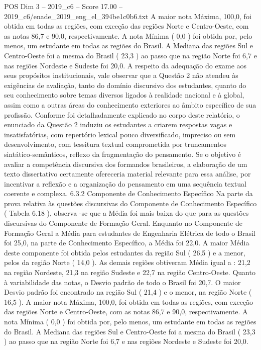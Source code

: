 \begin{textsample}{POS Dim 3 – 2019\_c6 – Score 17.00 – 2019\_c6/enade\_2019\_eng\_el\_394be1c0b6.txt}
A maior nota Máxima, 100,0, foi obtida em todas as regiões, com exceção das regiões Norte e Centro-Oeste, com as notas 86,7 e 90,0, respectivamente.
A nota Mínima ( 0,0 ) foi obtida por, pelo menos, um estudante em todas as regiões do Brasil.
A Mediana das regiões Sul e Centro-Oeste foi a mesma do Brasil ( 23,3 ) ao passo que na região Norte foi 6,7 e nas regiões Nordeste e Sudeste foi 20,0.
A respeito da adequação do exame aos seus propósitos institucionais, vale observar que a Questão 2 não atendeu às exigências de avaliação, tanto do domínio discursivo dos estudantes, quanto do seu conhecimento sobre temas diversos ligados à realidade nacional e à global, assim como a outras áreas do conhecimento exteriores ao âmbito específico de sua profissão.
Conforme foi detalhadamente explicado no corpo deste relatório, o enunciado da Questão 2 induziu os estudantes a criarem respostas vagas e insatisfatórias, com repertório lexical pouco diversificado, impreciso ou sem desenvolvimento, com tessitura textual comprometida por truncamentos sintático-semânticos, reflexo da fragmentação do pensamento.
Se o objetivo é avaliar a competência discursiva dos formandos brasileiros, a elaboração de um texto dissertativo certamente ofereceria material relevante para essa análise, por incentivar a reflexão e a organização do pensamento em uma sequência textual coerente e complexa. 6.3.2 Componente de Conhecimento Específico Na parte da prova relativa às questões discursivas do Componente de Conhecimento Específico ( Tabela 6.18 ), observa -se que a Média foi mais baixa do que para as questões discursivas do Componente de Formação Geral.
Enquanto no Componente de Formação Geral a Média para estudantes de Engenharia Elétrica de todo o Brasil foi 25,0, na parte de Conhecimento Específico, a Média foi 22,0.
A maior Média deste componente foi obtida pelos estudantes da região Sul ( 26,5 ) e a menor, pelos da região Norte ( 14,0 ).
As demais regiões obtiveram Média igual a : 21,2 na região Nordeste, 21,3 na região Sudeste e 22,7 na região Centro-Oeste.
Quanto à variabilidade das notas, o Desvio padrão de todo o Brasil foi 20,7.
O maior Desvio padrão foi encontrado na região Sul ( 21,4 ) e o menor, na região Norte ( 16,5 ).
A maior nota Máxima, 100,0, foi obtida em todas as regiões, com exceção das regiões Norte e Centro-Oeste, com as notas 86,7 e 90,0, respectivamente.
A nota Mínima ( 0,0 ) foi obtida por, pelo menos, um estudante em todas as regiões do Brasil.
A Mediana das regiões Sul e Centro-Oeste foi a mesma do Brasil ( 23,3 ) ao passo que na região Norte foi 6,7 e nas regiões Nordeste e Sudeste foi 20,0.

\end{textsample}
